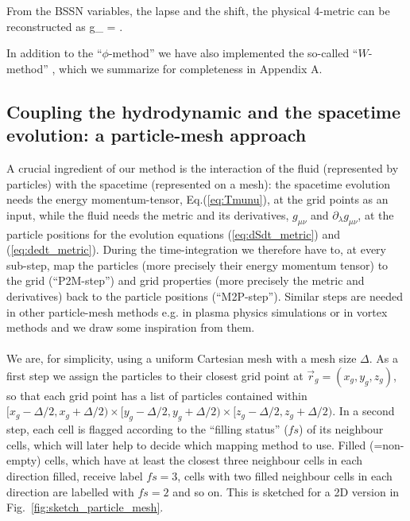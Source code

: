 \documentclass[useAMS,usenatbib]{iopart}
\begin{document}
From the BSSN variables, the lapse and the shift, the physical 4-metric can
be reconstructed as
\be
g_{\mu\nu} =  .\label{eq:phys_metric}
\ee

\noindent In addition to the ``$\phi$-method'' we have also implemented the so-called ``$W$-method'' \cite{marronetti08,tichy07}, which we summarize
for completeness in Appendix A.\\

\subsection{Coupling the hydrodynamic and the spacetime evolution: a particle-mesh approach}
\label{sec:particle_mesh}
A crucial ingredient of our method is the interaction of the fluid (represented by particles) with the 
spacetime (represented on a mesh): the spacetime evolution needs the energy momentum-tensor, 
Eq.(\ref{eq:Tmunu}), at the grid points as an input, while the fluid  needs the metric and its derivatives, 
$g_{\mu\nu}$ and $\partial_\lambda g_{\mu \nu}$, at the particle positions for the evolution equations (\ref{eq:dSdt_metric}) 
and (\ref{eq:dedt_metric}).  During the time-integration we therefore have to, at every sub-step, map the particles (more precisely their
energy momentum tensor) to the grid (``P2M-step'') and grid properties (more precisely the metric and derivatives) back to
the particle positions (``M2P-step''). Similar steps are needed in other particle-mesh methods e.g.
in plasma physics simulations \cite{hockney88} or in vortex methods \cite{cottet00} and we draw some inspiration from
them.\\


\\
We are, for simplicity, using a uniform Cartesian mesh with a mesh size $\Delta$.
As a first step we assign the particles to their closest grid point at $\vec{r}_{g}= (x_g,y_g,z_g)$, 
so that each grid point has a list of particles contained within 
$[x_g - \Delta/2, x_g + \Delta/2 ) \times [y_g - \Delta/2, y_g + \Delta/2 ) \times [z_g - \Delta/2, z_g + \Delta/2 )$.
In a second step, each cell is flagged according to the ``filling status'' ($fs$) of its neighbour cells, which will
later help to decide which mapping method to use. Filled (=non-empty) cells, which have at least the closest three neighbour cells
in each direction filled, receive label  $fs= 3$, cells with two filled neighbour cells in each direction are labelled with $fs= 2$
and so on. This is sketched for a 2D version in Fig.~\ref{fig:sketch_particle_mesh}.\\
\end{document}
